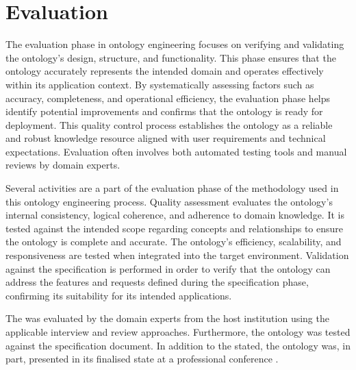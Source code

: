 \chapter{Evaluation}\label{ch: Evaluation}

The evaluation phase in ontology engineering focuses on verifying and validating the ontology's design, structure, and functionality. This phase ensures that the ontology accurately represents the intended domain and operates effectively within its application context. By systematically assessing factors such as accuracy, completeness, and operational efficiency, the evaluation phase helps identify potential improvements and confirms that the ontology is ready for deployment. This quality control process establishes the ontology as a reliable and robust knowledge resource aligned with user requirements and technical expectations. Evaluation often involves both automated testing tools and manual reviews by domain experts.

Several activities are a part of the evaluation phase of the methodology used in this ontology engineering process. 
Quality assessment evaluates the ontology’s internal consistency, logical coherence, and adherence to domain knowledge.
It is tested against the intended scope regarding concepts and relationships to ensure the ontology is complete and accurate. 
The ontology's efficiency, scalability, and responsiveness are tested when integrated into the target environment.
Validation against the specification is performed in order to verify that the ontology can address the features and requests defined during the specification phase, confirming its suitability for its intended applications.

The \magoontologyname was evaluated by the domain experts from the host institution using the applicable interview and review approaches. Furthermore, the ontology was tested against the specification document.
%
In addition to the stated, the ontology was, in part, presented in its finalised state at a professional conference \cite{okresaduric2024OntologyActionStreamlining}.